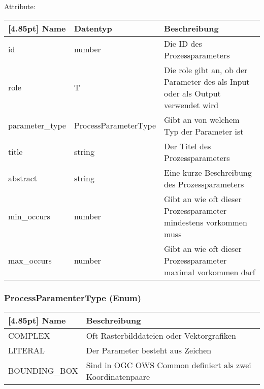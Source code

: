     		Attribute:
            \begin{center}
            	\renewcommand{\arraystretch}{1.5}
                \setlength\tabcolsep{5pt}
            	\begin{tabularx}{\textwidth}{|l|l|X|}
            		\hline
                    \rowcolor[gray]{0.75}[4.85pt]            		
                    Name & Datentyp & Beschreibung \\ \hline
            		id & number & Die ID des Prozessparameters \\ \hline
            		role & T & Die role gibt an, ob der Parameter des als Input oder als Output verwendet wird \\ \hline
            		parameter_type & ProcessParameterType & Gibt an von welchem Typ der Parameter ist \\ \hline
            		title & string & Der Titel des Prozessparameters \\ \hline
            		abstract & string & Eine kurze Beschreibung des Prozessparameters \\ \hline
            		min_occurs & number & Gibt an wie oft dieser Prozessparameter mindestens vorkommen muss \\ \hline
            		max_occurs & number & Gibt an wie oft dieser Prozessparameter maximal vorkommen darf \\ \hline
            	\end{tabularx}
            \end{center}
                
    		\subsubsection{ProcessParamenterType (Enum)}
    		
			\begin{center}
            	\renewcommand{\arraystretch}{1.5}
	            \setlength\tabcolsep{5pt}
            	\begin{tabularx}{\textwidth}{|l|X|}
            		\hline
                    \rowcolor[gray]{0.75}[4.85pt]
            	    Name & Beschreibung \\ \hline
            		COMPLEX & Oft Rasterbilddateien oder Vektorgrafiken \\ \hline
            		LITERAL & Der Parameter besteht aus Zeichen \\ \hline
            		BOUNDING_BOX & Sind in OGC OWS Common definiert als zwei Koordinatenpaare \\ \hline
				\end{tabularx}
			\end{center}
                
